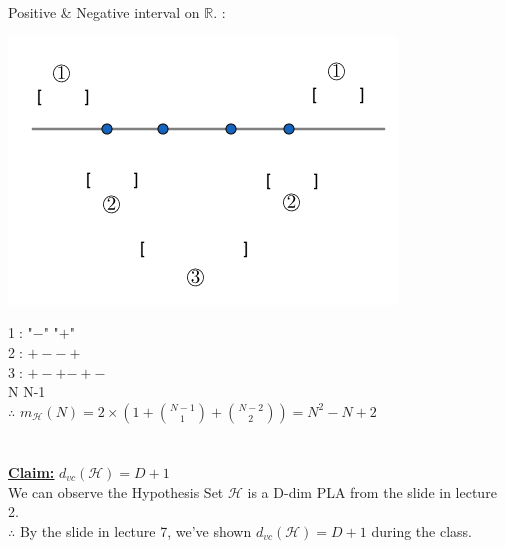 \documentclass[a4paper,12pt]{article}
\begin{document}
\section{}
Positive \& Negative interval on $\mathbb{R}$. {\MaQ{}}:\\
  \begin{minipage}{\linewidth}
      \begin{minipage}{0.45\linewidth}
\raggedright
\includegraphics[scale=0.5]{Q2.png}
      \end{minipage}
      \hspace{0.05\linewidth}
      \begin{minipage}{0.45\linewidth}
      \textcircled{1}: {\MaQ{}}"$-$" {\MbQ{}}"$+$"\\
      \textcircled{2}: $+-${\MbQ{}}$-+$\\
      \textcircled{3}: $+-+${\MbQ{}}$-+-$\\
      N {\MaQ{}}N-1\\
      $\therefore$ $m_{\mathcal{H}}(N)=2\times(1+{{N-1}\choose{1}} + {{N-2}\choose{2}})=N^{2}-N+2$
      \end{minipage}
  \end{minipage}

\section{}
\underline{\underline{\textbf{Claim:}}} $d_{vc}(\mathcal{H})=D+1$ \\
We can observe the Hypothesis Set $\mathcal{H}$ is a D-dim PLA from the slide in lecture 2.\\
$\therefore$ By the slide in lecture 7, we've shown $d_{vc}(\mathcal{H})=D+1$ during the class.
\end{document}
